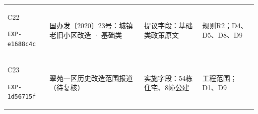 {\begin{longtable}{@{}L{29mm}L{36mm}L{56mm}L{32mm}@{}}
\hypertarget{EXP-e1688c4c-a449-48d4-9d16-38fea3ca845e}{C22}\newline\texttt{EXP-e1688c4c} & 国办发〔2020〕23号：城镇老旧小区改造 · 基础类 & 提议字段：基础类政策原文 & 规则R2；D4、D5、D8、D9\\
\hypertarget{EXP-1d56715f-f6b6-4e9f-8298-5ce656ee40c5}{C23}\newline\texttt{EXP-1d56715f} & 翠苑一区历史改造范围报道（待复核） & 实施字段：54栋住宅、8幢公建 & 工程范围；D1、D9\\
\bottomrule
\end{longtable}
}
